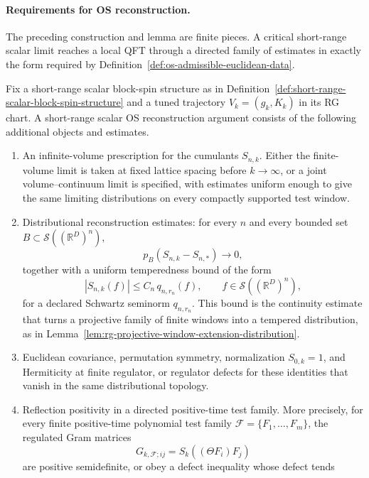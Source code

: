 \paragraph{Requirements for OS reconstruction.}
The preceding construction and lemma are finite pieces.  A critical
short-range scalar limit reaches a local QFT through a directed family of
estimates
in exactly the form required by
Definition~\ref{def:os-admissible-euclidean-data}.

\begin{definition}
\label{def:short-range-scalar-os-assembly-datum}
Fix a short-range scalar block-spin structure as in
Definition~\ref{def:short-range-scalar-block-spin-structure} and a tuned
trajectory \(V_k=(g_k,K_k)\) in its RG chart.  A short-range scalar
OS reconstruction argument consists of the following additional objects and
estimates.
\begin{enumerate}
  \item An infinite-volume prescription for the cumulants
  \(S_{n,k}\).  Either the finite-volume limit is taken at fixed lattice
  spacing before \(k\to\infty\), or a joint volume--continuum limit is
  specified, with estimates uniform enough to give the same limiting
  distributions on every compactly supported test window.
  \item Distributional reconstruction estimates: for every \(n\) and every
  bounded set \(B\subset\mathcal S((\mathbb R^D)^n)\),
  \[
    p_B(S_{n,k}-S_{n,\ast})\longrightarrow0 ,
  \]
  together with a uniform temperedness bound of the form
  \[
    |S_{n,k}(f)|
    \le C_n\,q_{n,r_n}(f),
    \qquad f\in\mathcal S((\mathbb R^D)^n),
  \]
  for a declared Schwartz seminorm \(q_{n,r_n}\).  This bound is the
  continuity estimate that turns a projective family of finite windows into
  a tempered distribution, as in
  Lemma~\ref{lem:rg-projective-window-extension-distribution}.
  \item Euclidean covariance, permutation symmetry, normalization
  \(S_{0,k}=1\), and Hermiticity at finite regulator, or regulator defects
  for these identities that vanish in the same distributional topology.
  \item Reflection positivity in a directed positive-time test family.  More
  precisely, for every finite positive-time polynomial test family
  \(\mathcal F=\{F_1,\ldots,F_m\}\), the regulated Gram matrices
  \[
    G_{k,\mathcal F;ij}
    =
    S_k((\Theta F_i)F_j)
  \]
  are positive semidefinite, or obey a defect inequality whose defect tends

\end{enumerate}
\end{definition}
